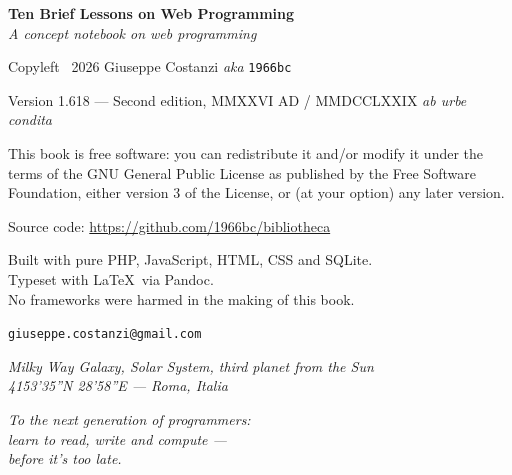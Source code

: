 \documentclass[11pt,a4paper,oneside]{book}
\providecommand{\textcopyleft}{\reflectbox{\copyright}}
\begin{document}
{\small

\textbf{Ten Brief Lessons on Web Programming}\\
\textit{A concept notebook on web programming}

\vspace{1em}

Copyleft \textcopyleft\ 2026 Giuseppe Costanzi \textit{aka} \texttt{1966bc}

\vspace{1em}

Version 1.618 --- Second edition, MMXXVI AD / MMDCCLXXIX \textit{ab urbe condita}

\vspace{1em}

This book is free software: you can redistribute it and/or modify
it under the terms of the GNU General Public License as published by
the Free Software Foundation, either version 3 of the License, or
(at your option) any later version.

\vspace{1em}

Source code: \url{https://github.com/1966bc/bibliotheca}

\vspace{1em}

Built with pure PHP, JavaScript, HTML, CSS and SQLite.\\
Typeset with \LaTeX\ via Pandoc.\\
No frameworks were harmed in the making of this book.

\vspace{1em}

\texttt{giuseppe.costanzi@gmail.com}

\vspace{1em}

{\footnotesize\itshape
Milky Way Galaxy, Solar System, third planet from the Sun\\
41\textdegree{}53'35''N \textdegree{}28'58''E --- Roma, Italia}
}

\newpage

\thispagestyle{empty}
\vspace*{5cm}
\begin{center}
\itshape\large
To the next generation of programmers:\\
learn to read, write and compute ---\\
before it's too late.
\end{center}
\newpage

{
\setlength{\parskip}{0.1em plus 0.1em}
\tableofcontents
}
\newpage
\end{document}
